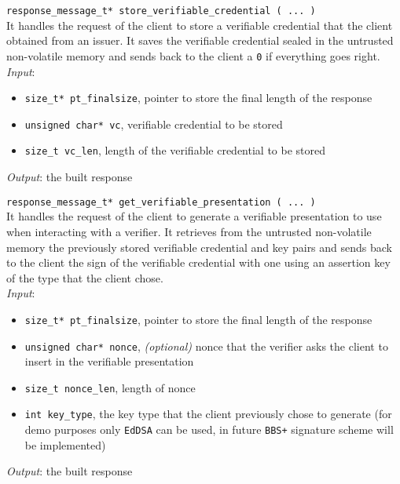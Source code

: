 \noindent
\texttt{response\_message\_t* store\_verifiable\_credential ( ... )}\\
It handles the request of the client to store a verifiable credential that the client obtained from an issuer. It saves the verifiable credential sealed in the untrusted non-volatile memory and sends back to the client a \texttt{0} if everything goes right. \\
\textit{Input}:
\begin{itemize}[noitemsep,nolistsep]
  \item \texttt{size\_t* pt\_finalsize}, pointer to store the final length of the response
  \item \texttt{unsigned char* vc}, verifiable credential to be stored
  \item \texttt{size\_t vc\_len}, length of the verifiable credential to be stored
\end{itemize}
\textit{Output}: the built response 

\noindent
\texttt{response\_message\_t* get\_verifiable\_presentation ( ... )}\\
It handles the request of the client to generate a verifiable presentation to use when interacting with a verifier. It retrieves from the untrusted non-volatile memory the previously stored verifiable credential and key pairs and sends back to the client the sign of the verifiable credential with one using an assertion key of the type that the client chose. \\
\textit{Input}:
\begin{itemize}[noitemsep,nolistsep]
  \item \texttt{size\_t* pt\_finalsize}, pointer to store the final length of the response
  \item \texttt{unsigned char* nonce}, \textit{(optional)} nonce that the verifier asks the client to insert in the verifiable presentation  
  \item \texttt{size\_t nonce\_len}, length of nonce
  \item \texttt{int key\_type}, the key type that the client previously chose to generate (for demo purposes only \texttt{EdDSA} can be used, in future \texttt{BBS+} signature scheme will be implemented)
\end{itemize}
\textit{Output}: the built response 

